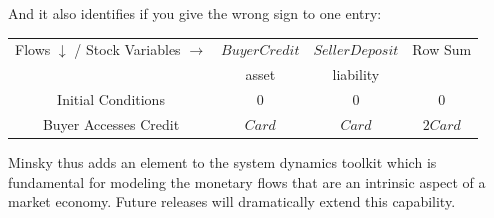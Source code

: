 And it also identifies if you give the wrong sign to one entry:

\begin{center}
\begin{tabular}{|c|cc|c|}
\hline
Flows $\downarrow$ / Stock Variables
$\rightarrow$&\multicolumn{1}{|c|}{$BuyerCredit$}&\multicolumn{1}{|c|}{$SellerDeposit$}&Row Sum\\\cline{2-3}&\multicolumn{1}{|c|}{asset}&\multicolumn{1}{|c|}{liability}&\\\hline
Initial Conditions&$0$&$0$&0\\
Buyer Accesses Credit&$Card$&$Card$&$2Card$\\
\hline
\end{tabular}
\end{center}

Minsky thus adds an element to the system dynamics toolkit which is
fundamental for modeling the monetary flows that are an intrinsic
aspect of a market economy. Future releases will dramatically extend
this capability. 

